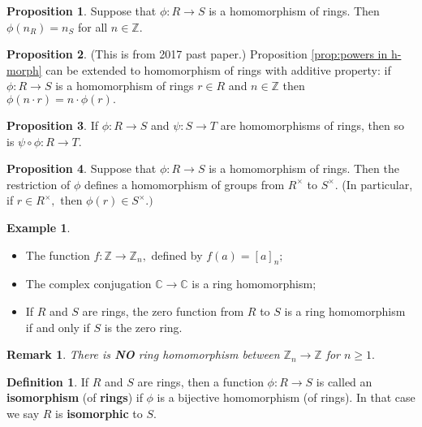 \documentclass[12pt, a4paper]{article}
\newcommand{\bb}[1]{\mathbb{#1}}
\newtheorem*{remark}{Remark}
\theoremstyle{definition}
\newtheorem{definition}{Definition}[section]
\newtheorem*{example}{Example}
\newtheorem{proposition}{Proposition}
\theoremstyle{plain}
\begin{document}
\begin{proposition}
Suppose that $\phi : R \to S$ is a homomorphism of rings.
Then $\phi(n_R)=n_S$ for all $n\in \bb{Z}.$
\end{proposition}

\begin{proposition}(This is from 2017 past paper.)
Proposition \ref{prop:powers in h-morph} can be extended to homomorphism of rings with additive property: if $\phi : R \to S$ is a homomorphism of rings $r \in R$ and $n\in \bb{Z}$ then $\phi(n\cdot r)=n\cdot \phi(r).$
\end{proposition}

\begin{proposition}
If $\phi : R \to S$ and $\psi : S \to T$ are homomorphisms of rings, then so is $\psi \circ \phi :R\to T.$
\end{proposition}

\begin{proposition}
Suppose that $\phi : R \to S$ is a homomorphism of rings. Then the restriction of $\phi$ defines a homomorphism of groups from $R^{\times}$ to $S^{\times}.$ (In particular, if $r \in R^{\times},$ then $\phi(r) \in S^{\times}.)$
\end{proposition}

\begin{example}
\begin{itemize}

	\item The function $f : \bb{Z} \to \bb{Z}_n,$ defined by $f(a) = [a]_n;$

	\item The complex conjugation $\bb{C} \to \bb{C}$ is a ring homomorphism;

	\item If $R$ and $S$ are rings, the zero function from $R$ to $S$ is a ring homomorphism if and only if $S$ is the zero ring.

\end{itemize}
\end{example}

\begin{remark}
There is \textbf{NO} ring homomorphism between $\bb{Z}_n\to \bb{Z}$ for $n\geq 1.$
\end{remark}

\begin{definition}
If $R$ and $S$ are rings, then a function $\phi : R \to S$ is called an \textbf{isomorphism} (of \textbf{rings}) if $\phi$ is a bijective homomorphism (of rings). In that case we say $R$ is \textbf{isomorphic} to $S.$
\end{definition}
\end{document}
